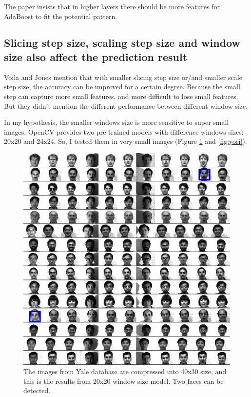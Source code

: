 \documentclass[10pt,twocolumn,letterpaper]{article}
\begin{document}
The paper insists that in higher layers there should be more features for AdaBoost to fit the potential pattern.


\subsection{Slicing step size, scaling step size and window size also affect the prediction result}
Voila and Jones mention that with smaller slicing step size or/and smaller scale step size, the accuracy can be improved for a certain degree.
Because the small step can capture more small features, and more difficult to lose small features.
But they didn't mention the different performance between different window size.

In my hypothesis, the smaller windows size is more sensitive to super small images.
OpenCV provides two pre-trained models with difference windows sizes: 20x20 and 24x24.
So, I tested them in very small images (Figure \ref{fig:ysmall} and \ref{fig:yori}).

\begin{figure}[t]
    \begin{center}
        \includegraphics[width=0.9\linewidth]{yaleallsmall}
    \end{center}
    \caption{The images from Yale database \cite{yaleimages} are compressed into 40x30 size, and this is the results from 20x20 window size model. Two faces can be detected.}
    \label{fig:ysmall}
\end{figure}
\end{document}
